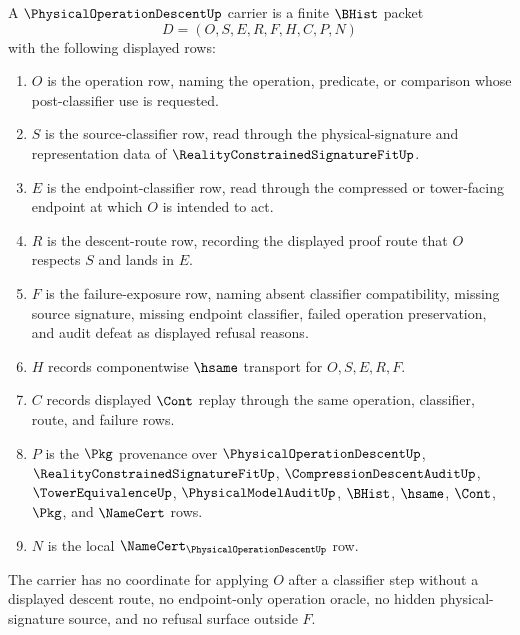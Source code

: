 \begin{definition}
\label{def:physical-operation-descent-carrier}
A $\PhysicalOperationDescentUp$ carrier is a finite $\BHist$ packet
$$
D=(O,S,E,R,F,H,C,P,N)
$$
with the following displayed rows:
\begin{enumerate}
\item $O$ is the operation row, naming the operation, predicate, or comparison whose post-classifier use is requested.
\item $S$ is the source-classifier row, read through the physical-signature and representation data of $\RealityConstrainedSignatureFitUp$.
\item $E$ is the endpoint-classifier row, read through the compressed or tower-facing endpoint at which $O$ is intended to act.
\item $R$ is the descent-route row, recording the displayed proof route that $O$ respects $S$ and lands in $E$.
\item $F$ is the failure-exposure row, naming absent classifier compatibility, missing source signature, missing endpoint classifier, failed operation preservation, and audit defeat as displayed refusal reasons.
\item $H$ records componentwise $\hsame$ transport for $O,S,E,R,F$.
\item $C$ records displayed $\Cont$ replay through the same operation, classifier, route, and failure rows.
\item $P$ is the $\Pkg$ provenance over $\PhysicalOperationDescentUp$, $\RealityConstrainedSignatureFitUp$, $\CompressionDescentAuditUp$, $\TowerEquivalenceUp$, $\PhysicalModelAuditUp$, $\BHist$, $\hsame$, $\Cont$, $\Pkg$, and $\NameCert$ rows.
\item $N$ is the local $\NameCert_{\PhysicalOperationDescentUp}$ row.
\end{enumerate}
The carrier has no coordinate for applying $O$ after a classifier step without a displayed descent route, no endpoint-only operation oracle, no hidden physical-signature source, and no refusal surface outside $F$.
\end{definition}

